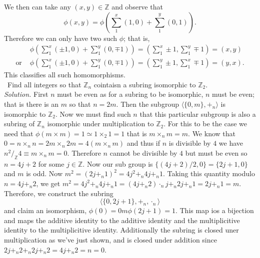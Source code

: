\documentclass[11pt]{amsart}
\begin{document}
We then can take any $(x,y) \in \mathbb{Z}$ and observe that 
\begin{equation*}
	\phi(x,y) =\phi\left(\sum_1^x (1,0) + \sum_1^y (0,1)\right). 
\end{equation*}
Therefore we can only have two such $\phi$; that is,
\begin{equation*}
\begin{aligned}
	&\phi\left(\sum_1^x (\pm1,0) + \sum_1^y (0,\mp1)\right) =\left(\sum_1^x \pm1 , \sum_1^y \mp1\right) = (x,y) \\
	\text{or } & \phi\left(\sum_1^x (\pm1,0) + \sum_1^y (0,\mp1)\right) =\left(\sum_1^y \pm1, \sum_1^x \mp1 \right) = (y,x).
\end{aligned}
\end{equation*}
This classifies all such homomorphisms.\\
\medskip {}\ Find all integers so that $\mathbb{Z}_n$ cointaisn a subring isomorphic to $\mathbb{Z}_2$. \\
\emph{Solution.} First $n$ must be even as for a subring to be isomorphic, $n$ must be even; that is there is an $m$ so that $n = 2m$. Then the subgroup $\langle{\{0, m\} , +_n}\rangle$ is isomorphic to $\mathbb{Z}_2$. Now we must find such $n$ that this particular subgroup is also a subring of $\mathbb{Z}_n$ isomorphic under multiplication to $\mathbb{Z}_2$. For this to be the case we need that $\phi(m\times m) = 1 \simeq 1\times_2 1 = 1	$ that is $m \times_n m = m.$ We know that $0 = n\times_n n = 2m \times_n 2m = 4 (m \times_n m)$ and thus if $n$ is divisible by $4$ we have $n^2/_\mathbb{Z}4 \equiv m \times_n m = 0. $ Therefore $n$ cannot be divisible by $4$ but must be even so $n = 4j + 2$ for some $j \in \mathbb{Z}.$ Now our sub group is $\{(4j +2)/2, 0\} = \{2j + 1, 0\}$ and $m$ is odd. Now $m^2 = (2j +_n1)^2 = 4j^2 +_n 4j +_n 1.$ Taking this quantity modulo $n = 4j+_n2$, we get $m^2 = 4j^2 +_n 4j +_n 1 = (4j +_n 2)\cdot_nj +_n 2j +_n1 = 2j +_n 1 = m.$ Therefore, we construct the subring
\begin{equation*}
 	\langle\{0, 2j+1\}, +_n, \cdot_n\rangle
 \end{equation*} 
 and claim an isomorphism, $\phi(0) = 0m \phi(2j+1)= 1.$ This map ios a bijection and maps the additive identity to the additive identity and the multiplicitive identity to the multiplicitive identity. Additionally the subring is closed uner multiplication as we've just shown, and is closed under addition since $2j +_n2 +_n 2j +_n 2 = 4j +_n 2 = n = 0$.
\end{document}
